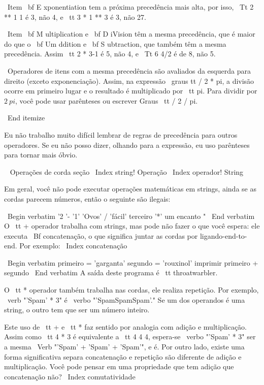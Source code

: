 \documentclass[10pt]{book}
\begin{document}
{\ Item {\ bf E} xponentiation tem a próxima precedência mais alta, por isso,
{\ Tt 2 ** 1 1} é 3, não 4, e {\ tt 3 * 1 ** 3} é 3, não 27.

\ Item {\ bf M} ultiplication e {\ bf D} iVision têm a mesma precedência,
que é maior do que o {\ bf Um ddition} e {\ bf S} ubtraction, que também
têm a mesma precedência. Assim {\ tt 2 * 3-1} é 5, não 4, e
{\ Tt 6 4/2} é de 8, não 5.

\ Operadores de itens com a mesma precedência são avaliados da esquerda para
  direito (exceto exponenciação). Assim, na expressão {\ graus tt /
    2 * pi}, a divisão ocorre em primeiro lugar e o resultado é multiplicado
  por {\ tt pi}. Para dividir por $ 2 \ pi $, você pode usar parênteses ou escrever
  {Graus \ tt / 2 / pi}.

\ End {itemize}

Eu não trabalho muito difícil lembrar de regras de precedência para outros
operadores. Se eu não posso dizer, olhando para a expressão, eu uso
parênteses para tornar mais óbvio.

\ {} Operações de corda seção
\ Index {string! Operação}
\ Index {operador! String}

Em geral, você não pode executar operações matemáticas em strings, ainda
se as cordas parecem números, então o seguinte são ilegais:

\ Begin {verbatim}
'2 '- '1' 'Ovos' / 'fácil' terceiro '*' um encanto "
\ End {verbatim}
%
O {\ tt +} operador trabalha com strings, mas
pode não fazer o que você espera: ele executa
{\ Bf concatenação}, o que significa juntar as cordas por
ligando-end-to-end. Por exemplo:
\ Index {concatenação}

\ Begin {verbatim}
primeiro = 'garganta'
segundo = 'rouxinol'
imprimir primeiro + segundo
\ End {verbatim}
%
A saída deste programa é {\ tt throatwarbler}.

O {\ tt *} operador também trabalha nas cordas, ele realiza repetição.
Por exemplo, \ verb "'Spam' * 3" é \ verbo "'SpamSpamSpam'." Se um dos operandos
é uma string, o outro tem que ser um número inteiro.

Este uso de {\ tt +} e {\ tt *} faz sentido por
analogia com adição e multiplicação. Assim como {\ tt 4 * 3} é
equivalente a {\ tt 4 4 4}, espera-se \ verbo "'Spam' * 3" ser a mesma
\ Verb "'Spam' + 'Spam' + 'Spam'", e é. Por outro lado, existe uma
forma significativa separa concatenação e repetição são
diferente de adição e multiplicação.
Você pode pensar em uma propriedade que tem adição
que concatenação não?
\ Index {} comutatividade


}
\end{document}
